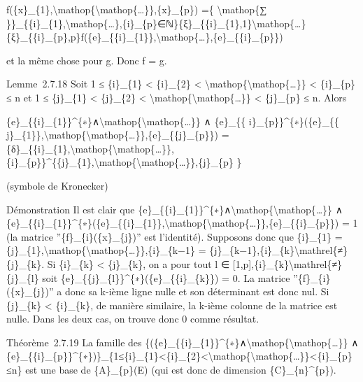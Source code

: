 \documentclass[]{article}
\begin{document}
f(\{x\}\_\{1\},\textbackslash{}mathop\{\textbackslash{}mathop\{\ldots{}\}\},\{x\}\_\{p\})
=\{ \textbackslash{}mathop\{∑
\}\}\_\{\{i\}\_\{1\},\textbackslash{}mathop\{\ldots{}\},\{i\}\_\{p\}∈ℕ\}\{ξ\}\_\{\{i\}\_\{1\},1\}\textbackslash{}mathop\{\ldots{}\}\{ξ\}\_\{\{i\}\_\{p\},p\}f(\{e\}\_\{\{i\}\_\{1\}\},\textbackslash{}mathop\{\ldots{}\},\{e\}\_\{\{i\}\_\{p\}\})

et la même chose pour g. Donc f = g.

Lemme~2.7.18 Soit 1 ≤ \{i\}\_\{1\} \textless{} \{i\}\_\{2\} \textless{}
\textbackslash{}mathop\{\textbackslash{}mathop\{\ldots{}\}\} \textless{}
\{i\}\_\{p\} ≤ n et 1 ≤ \{j\}\_\{1\} \textless{} \{j\}\_\{2\}
\textless{} \textbackslash{}mathop\{\textbackslash{}mathop\{\ldots{}\}\}
\textless{} \{j\}\_\{p\} ≤ n. Alors

\{e\}\_\{\{i\}\_\{1\}\}\^{}\{∗\}∧\textbackslash{}mathop\{\textbackslash{}mathop\{\ldots{}\}\}
∧ \{e\}\_\{\{ i\}\_\{p\}\}\^{}\{∗\}(\{e\}\_\{\{
j\}\_\{1\}\},\textbackslash{}mathop\{\textbackslash{}mathop\{\ldots{}\}\},\{e\}\_\{\{j\}\_\{p\}\})
=
\{δ\}\_\{\{i\}\_\{1\},\textbackslash{}mathop\{\textbackslash{}mathop\{\ldots{}\}\},\{i\}\_\{p\}\}\^{}\{\{j\}\_\{1\},\textbackslash{}mathop\{\textbackslash{}mathop\{\ldots{}\}\},\{j\}\_\{p\}
\}

(symbole de Kronecker)

Démonstration Il est clair que
\{e\}\_\{\{i\}\_\{1\}\}\^{}\{∗\}∧\textbackslash{}mathop\{\textbackslash{}mathop\{\ldots{}\}\}
∧
\{e\}\_\{\{i\}\_\{1\}\}\^{}\{∗\}(\{e\}\_\{\{i\}\_\{1\}\},\textbackslash{}mathop\{\textbackslash{}mathop\{\ldots{}\}\},\{e\}\_\{\{i\}\_\{p\}\})
= 1 (la matrice ''\{f\}\_\{i\}(\{x\}\_\{j\})'' est l'identité).
Supposons donc que \{i\}\_\{1\} =
\{j\}\_\{1\},\textbackslash{}mathop\{\textbackslash{}mathop\{\ldots{}\}\},\{i\}\_\{k−1\}
= \{j\}\_\{k−1\},\{i\}\_\{k\}\textbackslash{}mathrel\{≠\}\{j\}\_\{k\}.
Si \{i\}\_\{k\} \textless{} \{j\}\_\{k\}, on a pour tout l ∈
{[}1,p{]},\{i\}\_\{k\}\textbackslash{}mathrel\{≠\}\{j\}\_\{l\} soit
\{e\}\_\{\{j\}\_\{l\}\}\^{}\{∗\}(\{e\}\_\{\{i\}\_\{k\}\}) = 0. La
matrice ''\{f\}\_\{i\}(\{x\}\_\{j\})'' a donc sa k-ième ligne nulle et
son déterminant est donc nul. Si \{j\}\_\{k\} \textless{} \{i\}\_\{k\},
de manière similaire, la k-ième colonne de la matrice est nulle. Dans
les deux cas, on trouve donc 0 comme résultat.

Théorème~2.7.19 La famille des
\{(\{e\}\_\{\{i\}\_\{1\}\}\^{}\{∗\}∧\textbackslash{}mathop\{\textbackslash{}mathop\{\ldots{}\}\}
∧
\{e\}\_\{\{i\}\_\{p\}\}\^{}\{∗\})\}\_\{1≤\{i\}\_\{1\}\textless{}\{i\}\_\{2\}\textless{}\textbackslash{}mathop\{\textbackslash{}mathop\{\ldots{}\}\}\textless{}\{i\}\_\{p\}≤n\}
est une base de \{A\}\_\{p\}(E) (qui est donc de dimension
\{C\}\_\{n\}\^{}\{p\}).
\end{document}
